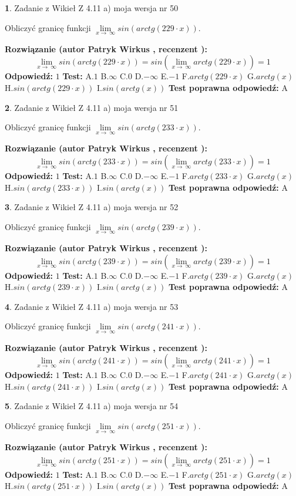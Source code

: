 \documentclass[12pt, a4paper]{article}
\theoremstyle{definition} %
\newtheorem{zad}{}
\newcommand{\zadStart}[1]{\begin{zad}#1\newline}
\newcommand{\zadStop}{\end{zad}}
\newcommand{\rozwStart}[2]{\noindent \textbf{Rozwiązanie (autor #1 , recenzent #2): }\newline}
\newcommand{\rozwStop}{\newline}
\newcommand{\odpStart}{\noindent \textbf{Odpowiedź:}\newline}
\newcommand{\odpStop}{\newline}
\newcommand{\testStart}{\noindent \textbf{Test:}\newline}
\newcommand{\testStop}{\newline}
\newcommand{\kluczStart}{\noindent \textbf{Test poprawna odpowiedź:}\newline}
\newcommand{\kluczStop}{\newline}
\begin{document}
\zadStart{Zadanie z Wikieł Z 4.11 a) moja wersja nr 50}

Obliczyć granicę funkcji  $\lim\limits_{x\to\ \infty}sin(arctg(229\cdot x))$.
\zadStop
\rozwStart{Patryk Wirkus}{}
$$\lim\limits_{x\to\ \infty}sin(arctg(229\cdot x)) = sin(\lim\limits_{x\to\ \infty}arctg(229\cdot x)) = 1$$
\rozwStop
\odpStart
$1$
\odpStop
\testStart
A.$1$ B.$\infty$ C.$0$ D.$-\infty$ E.$-1$
F.$arctg(229\cdot x)$ G.$arctg(x)$
H.$sin(arctg(229\cdot x))$
I.$sin(arctg(x))$
\testStop
\kluczStart
A
\kluczStop



\zadStart{Zadanie z Wikieł Z 4.11 a) moja wersja nr 51}

Obliczyć granicę funkcji  $\lim\limits_{x\to\ \infty}sin(arctg(233\cdot x))$.
\zadStop
\rozwStart{Patryk Wirkus}{}
$$\lim\limits_{x\to\ \infty}sin(arctg(233\cdot x)) = sin(\lim\limits_{x\to\ \infty}arctg(233\cdot x)) = 1$$
\rozwStop
\odpStart
$1$
\odpStop
\testStart
A.$1$ B.$\infty$ C.$0$ D.$-\infty$ E.$-1$
F.$arctg(233\cdot x)$ G.$arctg(x)$
H.$sin(arctg(233\cdot x))$
I.$sin(arctg(x))$
\testStop
\kluczStart
A
\kluczStop



\zadStart{Zadanie z Wikieł Z 4.11 a) moja wersja nr 52}

Obliczyć granicę funkcji  $\lim\limits_{x\to\ \infty}sin(arctg(239\cdot x))$.
\zadStop
\rozwStart{Patryk Wirkus}{}
$$\lim\limits_{x\to\ \infty}sin(arctg(239\cdot x)) = sin(\lim\limits_{x\to\ \infty}arctg(239\cdot x)) = 1$$
\rozwStop
\odpStart
$1$
\odpStop
\testStart
A.$1$ B.$\infty$ C.$0$ D.$-\infty$ E.$-1$
F.$arctg(239\cdot x)$ G.$arctg(x)$
H.$sin(arctg(239\cdot x))$
I.$sin(arctg(x))$
\testStop
\kluczStart
A
\kluczStop



\zadStart{Zadanie z Wikieł Z 4.11 a) moja wersja nr 53}

Obliczyć granicę funkcji  $\lim\limits_{x\to\ \infty}sin(arctg(241\cdot x))$.
\zadStop
\rozwStart{Patryk Wirkus}{}
$$\lim\limits_{x\to\ \infty}sin(arctg(241\cdot x)) = sin(\lim\limits_{x\to\ \infty}arctg(241\cdot x)) = 1$$
\rozwStop
\odpStart
$1$
\odpStop
\testStart
A.$1$ B.$\infty$ C.$0$ D.$-\infty$ E.$-1$
F.$arctg(241\cdot x)$ G.$arctg(x)$
H.$sin(arctg(241\cdot x))$
I.$sin(arctg(x))$
\testStop
\kluczStart
A
\kluczStop



\zadStart{Zadanie z Wikieł Z 4.11 a) moja wersja nr 54}

Obliczyć granicę funkcji  $\lim\limits_{x\to\ \infty}sin(arctg(251\cdot x))$.
\zadStop
\rozwStart{Patryk Wirkus}{}
$$\lim\limits_{x\to\ \infty}sin(arctg(251\cdot x)) = sin(\lim\limits_{x\to\ \infty}arctg(251\cdot x)) = 1$$
\rozwStop
\odpStart
$1$
\odpStop
\testStart
A.$1$ B.$\infty$ C.$0$ D.$-\infty$ E.$-1$
F.$arctg(251\cdot x)$ G.$arctg(x)$
H.$sin(arctg(251\cdot x))$
I.$sin(arctg(x))$
\testStop
\kluczStart
A
\kluczStop
\end{document}

